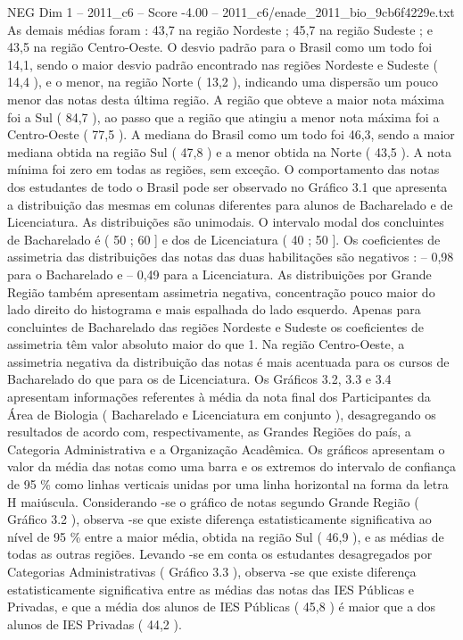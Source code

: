 \begin{textsample}{NEG Dim 1 – 2011\_c6 – Score -4.00 – 2011\_c6/enade\_2011\_bio\_9cb6f4229e.txt}
As demais médias foram : 43,7 na região Nordeste ; 45,7 na região Sudeste ; e 43,5 na região Centro-Oeste.
O desvio padrão para o Brasil como um todo foi 14,1, sendo o maior desvio padrão encontrado nas regiões Nordeste e Sudeste ( 14,4 ), e o menor, na região Norte ( 13,2 ), indicando uma dispersão um pouco menor das notas desta última região.
A região que obteve a maior nota máxima foi a Sul ( 84,7 ), ao passo que a região que atingiu a menor nota máxima foi a Centro-Oeste ( 77,5 ).
A mediana do Brasil como um todo foi 46,3, sendo a maior mediana obtida na região Sul ( 47,8 ) e a menor obtida na Norte ( 43,5 ).
A nota mínima foi zero em todas as regiões, sem exceção.
O comportamento das notas dos estudantes de todo o Brasil pode ser observado no Gráfico 3.1 que apresenta a distribuição das mesmas em colunas diferentes para alunos de Bacharelado e de Licenciatura.
As distribuições são unimodais.
O intervalo modal dos concluintes de Bacharelado é ( 50 ; 60 ] e dos de Licenciatura ( 40 ; 50 ].
Os coeficientes de assimetria das distribuições das notas das duas habilitações são negativos : – 0,98 para o Bacharelado e – 0,49 para a Licenciatura.
As distribuições por Grande Região também apresentam assimetria negativa, concentração pouco maior do lado direito do histograma e mais espalhada do lado esquerdo.
Apenas para concluintes de Bacharelado das regiões Nordeste e Sudeste os coeficientes de assimetria têm valor absoluto maior do que 1.
Na região Centro-Oeste, a assimetria negativa da distribuição das notas é mais acentuada para os cursos de Bacharelado do que para os de Licenciatura.
Os Gráficos 3.2, 3.3 e 3.4 apresentam informações referentes à média da nota final dos Participantes da Área de Biologia ( Bacharelado e Licenciatura em conjunto ), desagregando os resultados de acordo com, respectivamente, as Grandes Regiões do país, a Categoria Administrativa e a Organização Acadêmica.
Os gráficos apresentam o valor da média das notas como uma barra e os extremos do intervalo de confiança de 95 \% como linhas verticais unidas por uma linha horizontal na forma da letra H maiúscula.
Considerando -se o gráfico de notas segundo Grande Região ( Gráfico 3.2 ), observa -se que existe diferença estatisticamente significativa ao nível de 95 \% entre a maior média, obtida na região Sul ( 46,9 ), e as médias de todas as outras regiões.
Levando -se em conta os estudantes desagregados por Categorias Administrativas ( Gráfico 3.3 ), observa -se que existe diferença estatisticamente significativa entre as médias das notas das IES Públicas e Privadas, e que a média dos alunos de IES Públicas ( 45,8 ) é maior que a dos alunos de IES Privadas ( 44,2 ).

\end{textsample}
